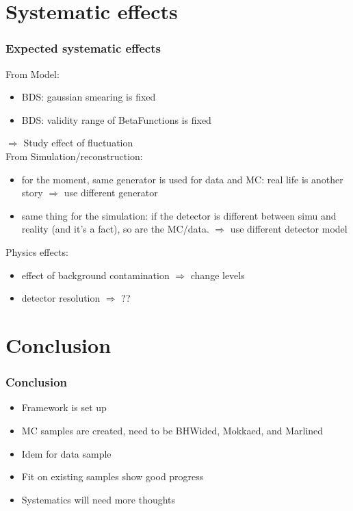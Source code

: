\documentclass{beamer}
\begin{document}
\section{Systematic effects}
\begin{frame}
\frametitle{Expected systematic effects}
From Model:
\begin{itemize}
  \item BDS: gaussian smearing is fixed
  \item BDS: validity range of BetaFunctions is fixed
\end{itemize}
  $\Rightarrow$ Study effect of fluctuation\\
\pause
From Simulation/reconstruction:
\begin{itemize}
  \item for the moment, same generator is used for data and MC: real life is
  another story $\Rightarrow$ use different generator
  \item same thing for the simulation: if the detector is different between
  simu and reality (and it's a fact), so are the MC/data. $\Rightarrow$ use
  different detector model
\end{itemize}
\pause
Physics effects:
\begin{itemize}
  \item effect of background contamination $\Rightarrow$ change levels
  \item detector resolution $\Rightarrow$ ??
\end{itemize}
\end{frame}
\section{Conclusion}
\begin{frame}
\frametitle{Conclusion}
\begin{itemize}
  \item Framework is set up
  \item MC samples are created, need to be BHWided, Mokkaed, and Marlined
  \item Idem for data sample
  \item Fit on existing samples show good progress
  \item Systematics will need more thoughts
\end{itemize}

\end{frame}
\end{document}
